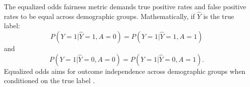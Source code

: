 The equalized odds fairness metric demands true positive rates and false positive rates to be equal across demographic groups. Mathematically, if $\hat{Y}$ is the true label:
%
\vspace{-0.1cm}\begin{equation}
P(Y\!=\!1|\hat{Y}\!=\!1, A\!=\!0) \!=\! P(Y\!=\!1|\hat{Y}\!=\!1, A\!=\!1)
\end{equation}
%
and
%
\vspace{-0.1cm}\begin{equation}
P(Y\!=\!1|\hat{Y}\!=\!0, A\!=\!0) \!=\! P(Y\!=\!1|\hat{Y}\!=\!0, A\!=\!1).
\end{equation}
%
Equalized odds aims for outcome independence across demographic groups when conditioned on the true label \cite{hardt2016}. %

%
%

%
%

